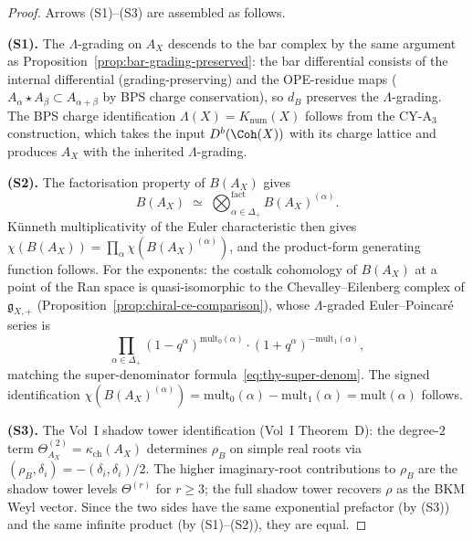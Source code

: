 \begin{proof}
Arrows (S1)--(S3) are assembled as follows.

\smallskip\noindent\textbf{(S1).} The $\Lambda$-grading on $A_X$ descends to the bar complex by the same argument as Proposition~\ref{prop:bar-grading-preserved}: the bar differential consists of the internal differential (grading-preserving) and the OPE-residue maps ($A_\alpha \star A_\beta \subset A_{\alpha+\beta}$ by BPS charge conservation), so $d_B$ preserves the $\Lambda$-grading. The BPS charge identification $\Lambda(X) = K_{\mathrm{num}}(X)$ follows from the CY-A$_3$ construction, which takes the input $D^b(\Coh(X))$ with its charge lattice and produces $A_X$ with the inherited $\Lambda$-grading.

\smallskip\noindent\textbf{(S2).} The factorisation property of $B(A_X)$ gives
\[
 B(A_X) \;\simeq\; \bigotimes_{\alpha \in \Delta_+}^{\mathrm{fact}} B(A_X)^{(\alpha)}.
\]
K\"unneth multiplicativity of the Euler characteristic then gives $\chi(B(A_X)) = \prod_\alpha \chi(B(A_X)^{(\alpha)})$, and the product-form generating function follows. For the exponents: the costalk cohomology of $B(A_X)$ at a point of the Ran space is quasi-isomorphic to the Chevalley--Eilenberg complex of $\mathfrak{g}_{X,+}$ (Proposition~\ref{prop:chiral-ce-comparison}), whose $\Lambda$-graded Euler--Poincar\'e series is
\[
 \prod_{\alpha \in \Delta_+} (1 - q^\alpha)^{\mathrm{mult}_0(\alpha)} \cdot (1 + q^\alpha)^{-\mathrm{mult}_1(\alpha)},
\]
matching the super-denominator formula~\eqref{eq:thy-super-denom}. The signed identification $\chi(B(A_X)^{(\alpha)}) = \mathrm{mult}_0(\alpha) - \mathrm{mult}_1(\alpha) = \mathrm{mult}(\alpha)$ follows.

\smallskip\noindent\textbf{(S3).} The Vol~I shadow tower identification (Vol~I Theorem~D): the degree-$2$ term $\Theta^{(2)}_{A_X} = \kappa_{\mathrm{ch}}(A_X)$ determines $\rho_B$ on simple real roots via $(\rho_B, \delta_i) = -(\delta_i, \delta_i)/2$. The higher imaginary-root contributions to $\rho_B$ are the shadow tower levels $\Theta^{(r)}$ for $r \geq 3$; the full shadow tower recovers $\rho$ as the BKM Weyl vector. Since the two sides have the same exponential prefactor (by (S3)) and the same infinite product (by (S1)--(S2)), they are equal.
\end{proof}

